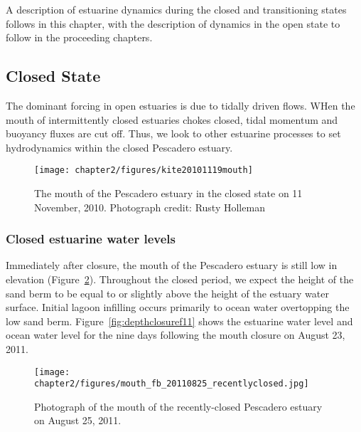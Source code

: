 A description of estuarine dynamics during the closed and transitioning states follows in this chapter, with the description of dynamics in the open state to follow in the proceeding chapters.


\subsection{Closed State} \label{ssec:ClosedDynamics}

The dominant forcing in open estuaries is due to tidally driven flows. WHen the mouth of intermittently closed estuaries chokes closed, tidal momentum and buoyancy fluxes are cut off. Thus, we look to other estuarine processes to set hydrodynamics within the closed Pescadero estuary. 

\begin{figure}
	\begin{center}
		\texttt{[image: chapter2/figures/kite20101119mouth]} 
	\end{center}
\caption{The mouth of the Pescadero estuary in the closed state on 11 November, 2010.  Photograph credit: Rusty Holleman}\label{fig:kite_photos_closed} \end{figure}



\subsubsection{Closed estuarine water levels} \label{cl_wl}

Immediately after closure, the mouth of the Pescadero estuary is still low in elevation (Figure~\ref{fig:mouth_fb_20110825}). Throughout the closed period, we expect the height of the sand berm to be equal to or slightly above the height of the estuary water surface. Initial lagoon infilling occurs primarily to ocean water overtopping the low sand berm. Figure~\ref{fig:depthclosuref11} shows the estuarine water level and ocean water level for the nine days following the mouth closure on August 23, 2011. 


\begin{figure}
\centering
		\texttt{[image: chapter2/figures/mouth\_fb\_20110825\_recentlyclosed.jpg]} \caption{Photograph of the mouth of the recently-closed Pescadero estuary on August 25, 2011.} \label{fig:mouth_fb_20110825}
\end{figure}


